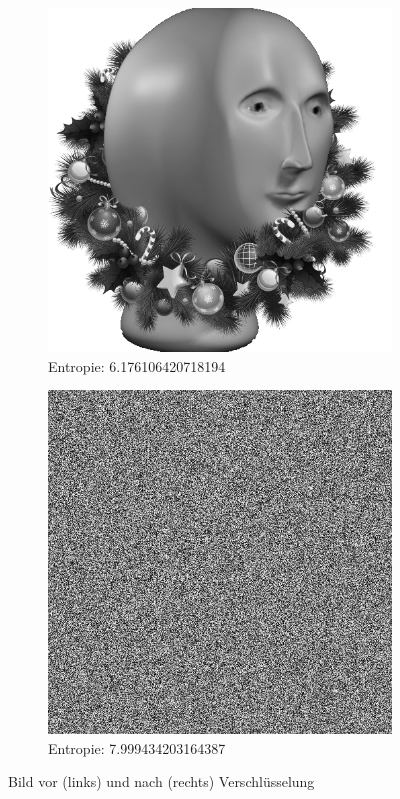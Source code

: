 \begin{figure}
	\centering

	\begin{subfigure}{0.35\textwidth}
		\includegraphics[width=\textwidth]{../1/3/gray_6.176106420718194_meme_man.png}
		\caption{Entropie: 6.176106420718194}
	\end{subfigure}
	\hfill
	\begin{subfigure}{0.35\textwidth}
		\includegraphics[width=\textwidth]{../1/3/encrypted_7.9994342031643875_meme_man.png}
		\caption{Entropie: 7.999434203164387}
	\end{subfigure}

	\caption{Bild vor (links) und nach (rechts) Verschlüsselung}
	\label{fig:meme_man}
\end{figure}

